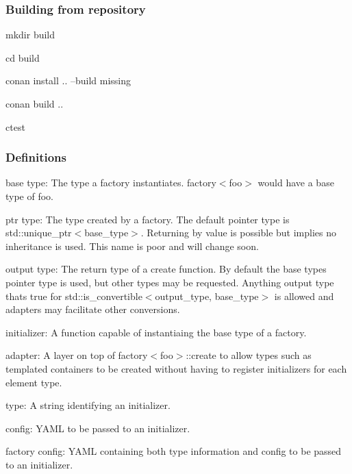 \subsubsection*{Building from repository}


\begin{DoxyItemize}
\item mkdir build
\item cd build
\item conan install .. --build missing
\item conan build ..
\item ctest
\end{DoxyItemize}

\subsubsection*{Definitions}


\begin{DoxyItemize}
\item base type\+: The type a factory instantiates. factory$<$foo$>$ would have a base type of foo.
\item ptr type\+: The type created by a factory. The default pointer type is std\+::unique\+\_\+ptr$<$base\+\_\+type$>$. Returning by value is possible but implies no inheritance is used. This name is poor and will change soon.
\item output type\+: The return type of a create function. By default the base types pointer type is used, but other types may be requested. Anything output type that\textquotesingle{}s true for std\+::is\+\_\+convertible$<$output\+\_\+type, base\+\_\+type$>$ is allowed and adapters may facilitate other conversions.
\item initializer\+: A function capable of instantiaing the base type of a factory.
\item adapter\+: A layer on top of factory$<$foo$>$\+::create to allow types such as templated containers to be created without having to register initializers for each element type.
\item type\+: A string identifying an initializer.
\item config\+: Y\+A\+ML to be passed to an initializer.
\item factory config\+: Y\+A\+ML containing both type information and config to be passed to an initializer. 
\end{DoxyItemize}